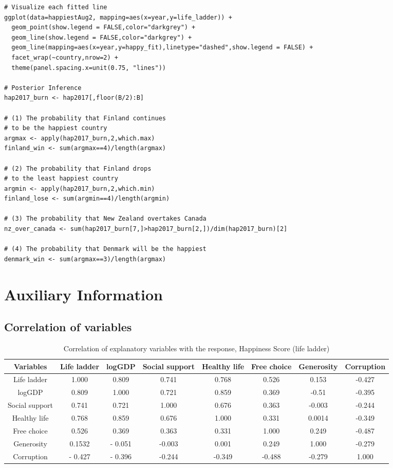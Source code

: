 \documentclass{article}
\begin{document}
\begin{verbatim}
# Visualize each fitted line
ggplot(data=happiestAug2, mapping=aes(x=year,y=life_ladder)) +
  geom_point(show.legend = FALSE,color="darkgrey") +
  geom_line(show.legend = FALSE,color="darkgrey") + 
  geom_line(mapping=aes(x=year,y=happy_fit),linetype="dashed",show.legend = FALSE) +
  facet_wrap(~country,nrow=2) +
  theme(panel.spacing.x=unit(0.75, "lines"))

# Posterior Inference
hap2017_burn <- hap2017[,floor(B/2):B]

# (1) The probability that Finland continues 
# to be the happiest country
argmax <- apply(hap2017_burn,2,which.max)
finland_win <- sum(argmax==4)/length(argmax)

# (2) The probability that Finland drops
# to the least happiest country
argmin <- apply(hap2017_burn,2,which.min)
finland_lose <- sum(argmin==4)/length(argmin)

# (3) The probability that New Zealand overtakes Canada
nz_over_canada <- sum(hap2017_burn[7,]>hap2017_burn[2,])/dim(hap2017_burn)[2]

# (4) The probability that Denmark will be the happiest
denmark_win <- sum(argmax==3)/length(argmax)
\end{verbatim}

\section{Auxiliary Information} \label{sec:adx_extra}
\subsection{Correlation of variables}
\begin{table}[h!]
\centering
\caption{\label{tab:corr} Correlation of explanatory variables with the response, Happiness Score (life ladder)}
\begin{tabular}{c c c c c c c c } \hline
Variables & Life ladder & logGDP & Social support & Healthy life & Free choice & Generosity & Corruption \\\hline
Life ladder & 1.000 & 0.809 & 0.741 & 0.768 & 0.526 & 0.153 & -0.427 \\
logGDP  & 0.809 & 1.000 & 0.721 & 0.859 & 0.369 & -0.51 & -0.395 \\
Social support & 0.741 & 0.721& 1.000 &0.676 &0.363 & -0.003 & -0.244 \\
Healthy life & 0.768 & 0.859 & 0.676&1.000 &0.331 &0.0014 & -0.349 \\ 
Free choice & 0.526 & 0.369& 0.363 &0.331 &1.000 & 0.249 & -0.487 \\
Generosity & 0.1532 & - 0.051 &-0.003 &0.001 & 0.249 &1.000 & -0.279\\
Corruption & - 0.427 & - 0.396 &  -0.244& -0.349 &-0.488 & -0.279 & 1.000 \\\hline
\end{tabular}
\end{table}
\end{document}
